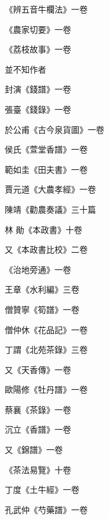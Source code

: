 \begin{pinyinscope}
 《辨五音牛欄法》一卷



 《農家切要》一卷



 《荔枝故事》一卷



 並不知作者



 封演《錢譜》一卷



 張臺《錢錄》一卷



 於公甫《古今泉貨圖》一卷



 侯氏《萱堂香譜》一卷



 範如圭《田夫書》一卷



 賈元道《大農孝經》一卷



 陳靖《勸農奏議》三十篇



 林
 勛《本政書》十卷



 又《本政書比校》二卷



 《治地旁通》一卷



 王章《水利編》三卷



 僧贊寧《筍譜》一卷



 僧仲休《花品記》一卷



 丁謂《北苑茶錄》三卷



 又《天香傳》一卷



 歐陽修《牡丹譜》一卷



 蔡襄《茶錄》一卷



 沉立《香譜》一卷



 又《錦譜》一卷



 《茶法易覽》十卷



 丁度《土牛經》一卷



 孔武仲《芍藥譜》一卷




\end{pinyinscope}
